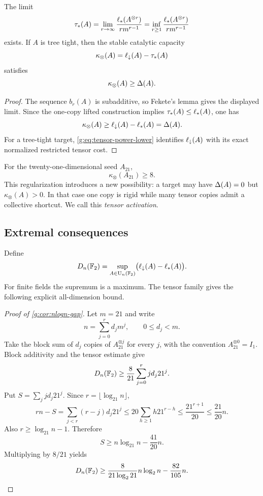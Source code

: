 \begin{proposition}\label{g:prop:stable-tensor-length}
The limit
\[
\tau_*(A)
=
\lim_{r\to\infty}
\frac{\ell_{*}(A^{\otimes r})}{r m^{r-1}}
=
\inf_{r\ge1}
\frac{\ell_{*}(A^{\otimes r})}{r m^{r-1}}
\]
exists.  If $A$ is tree tight, then the stable catalytic capacity
\[
\kappa_\otimes(A)
=
\ell_{\downarrow}(A)-\tau_*(A)
\]
satisfies
\[
\kappa_\otimes(A)\ge\Delta(A).
\]
\end{proposition}

\begin{proof}
The sequence $b_r(A)$ is subadditive, so Fekete's lemma gives the displayed limit.  Since the one-copy lifted construction implies $\tau_*(A)\le\ell_{*}(A)$, one has
\[
\kappa_\otimes(A)
\ge
\ell_{\downarrow}(A)-\ell_{*}(A)
=
\Delta(A).
\]
For a tree-tight target, \cref{g:eq:tensor-power-lower} identifies $\ell_{\downarrow}(A)$ with its exact normalized restricted tensor cost.
\end{proof}

For the twenty-one-dimensional seed $A_{21}$,
\[
\kappa_\otimes(A_{21})\ge8.
\]
This regularization introduces a new possibility: a target may have $\Delta(A)=0$ but $\kappa_\otimes(A)>0$.  In that case one copy is rigid while many tensor copies admit a collective shortcut.  We call this \emph{tensor activation}.

\subsection{Extremal consequences}

Define
\[
D_n(\mathbb F_2)
=
\sup_{A\in\operatorname{U}_n(\mathbb F_2)}
\bigl(\ell_{\downarrow}(A)-\ell_{*}(A)\bigr).
\]
For finite fields the supremum is a maximum.  The tensor family gives the following explicit all-dimension bound.

\begin{proof}[Proof of \cref{g:cor:nlogn-gap}]
Let $m=21$ and write
\[
n=\sum_{j=0}^{r}d_jm^j,
\qquad
0\le d_j<m.
\]
Take the block sum of $d_j$ copies of $A_{21}^{\otimes j}$ for every $j$, with the convention $A_{21}^{\otimes0}=I_1$.  Block additivity and the tensor estimate give
\[
D_n(\mathbb F_2)
\ge
\frac{8}{21}
\sum_{j=0}^{r}j d_j21^j.
\]
Put $S=\sum_j j d_j21^j$.  Since $r=\lfloor\log_{21}n\rfloor$,
\[
r n-S
=
\sum_{j<r}(r-j)d_j21^j
\le
20\sum_{h\ge1}h21^{r-h}
\le
\frac{21^{r+1}}{20}
\le
\frac{21}{20}n.
\]
Also $r\ge\log_{21}n-1$.  Therefore
\[
S\ge n\log_{21}n-\frac{41}{20}n.
\]
Multiplying by $8/21$ yields
\[
D_n(\mathbb F_2)
\ge
\frac{8}{21\log_2 21}n\log_2n
-
\frac{82}{105}n.
\]
\end{proof}

